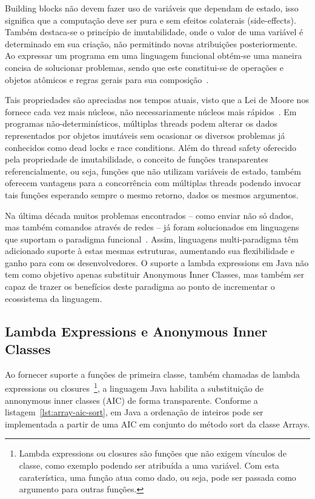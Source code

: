 \documentclass[10pt, conference]{IEEEtran}
\begin{document}
Building blocks não devem fazer uso de variáveis que dependam de estado, isso significa que a computação deve ser pura e sem efeitos colaterais (side-effects). Também destaca-se o princípio de imutabilidade, onde o valor de uma variável é determinado em sua criação, não permitindo novas atribuições posteriormente. Ao expressar um programa em uma linguagem funcional obtém-se uma maneira concisa de solucionar problemas, sendo que este constitui-se de operações e objetos atômicos e regras gerais para sua composição~\cite{michaelson2011introduction}.

Tais propriedades são apreciadas nos tempos atuais, visto que a Lei de Moore nos fornece cada vez mais núcleos, não necessariamente núcleos mais rápidos~\cite{jsr335}. Em programas não-determinísticos, múltiplas threads podem alterar os dados representados por objetos imutáveis sem ocasionar os diversos problemas já conhecidos como dead locks e race conditions. Além do thread safety oferecido pela propriedade de imutabilidade, o conceito de funções transparentes referencialmente, ou seja, funções que não utilizam variáveis de estado, também oferecem vantagens para a concorrência com múltiplas threads podendo invocar tais funções esperando sempre o mesmo retorno, dados os mesmos argumentos.

Na última década muitos problemas encontrados -- como enviar não só dados, mas também comandos através de redes -- já foram solucionados em linguagens que suportam o paradigma funcional~\cite{fischer2015java}. Assim, linguagens multi-paradigma têm adicionado suporte à estas mesmas estruturas, aumentando sua flexibilidade e ganho para com os desenvolvedores. O suporte a lambda expressions em Java não tem como objetivo apenas substituir Anonymous Inner Classes, mas também ser capaz de trazer os benefícios deste paradigma ao ponto de incrementar o ecossistema da linguagem.

\subsection{Lambda Expressions e Anonymous Inner Classes}
Ao fornecer suporte a funções de primeira classe, também chamadas de lambda expressions ou closures~\footnote{Lambda expressions ou closures são funções que não exigem vínculos de classe, como exemplo podendo ser atribuída a uma variável. Com esta caraterística, uma função atua como dado, ou seja, pode ser passada como argumento para outras funções.}, a linguagem Java habilita a substituição de annonymous inner classes (AIC) de forma transparente. Conforme a listagem~\ref{lst:array-aic-sort}, em Java a ordenação de inteiros pode ser implementada a partir de uma AIC em conjunto do método sort da classe Arrays.
\end{document}
